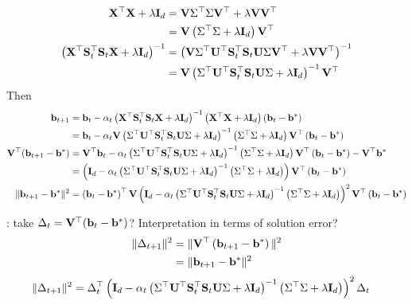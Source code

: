 \documentclass[10pt]{article}
\begin{document}
\begin{align*}
\mathbf{X}^\top\mathbf{X}+\lambda\mathbf{I}_d &= \mathbf{V}\Sigma^\top\Sigma\mathbf{V}^\top + \lambda \mathbf{V}\mathbf{V}^\top \\
&= \mathbf{V}\left(\Sigma^\top\Sigma + \lambda\mathbf{I}_d\right)\mathbf{V}^\top \\
\left(\mathbf{X}^\top\mathbf{S}_t^\top\mathbf{S}_t\mathbf{X} + \lambda\mathbf{I}_d\right)^{-1} &= \left(\mathbf{V}\Sigma^\top\mathbf{U}^\top\mathbf{S}_t^\top\mathbf{S}_t\mathbf{U}\Sigma\mathbf{V}^\top + \lambda\mathbf{V}\mathbf{V}^\top\right)^{-1} \\
&= \mathbf{V}\left(\Sigma^\top\mathbf{U}^\top\mathbf{S}_t^\top\mathbf{S}_t\mathbf{U}\Sigma + \lambda\mathbf{I}_d\right)^{-1}\mathbf{V}^\top
\end{align*}
Then
\begin{align*}
\mathbf{b}_{t+1} &= \mathbf{b}_t - \alpha_t\left(\mathbf{X}^\top\mathbf{S}_t^\top\mathbf{S}_t\mathbf{X} + \lambda\mathbf{I}_d\right)^{-1}\left(\mathbf{X}^\top\mathbf{X}+\lambda\mathbf{I}_d\right)\left(\mathbf{b}_t-\mathbf{b}^*\right) \\
&= \mathbf{b}_t - \alpha_t\mathbf{V}\left(\Sigma^\top\mathbf{U}^\top\mathbf{S}_t^\top\mathbf{S}_t\mathbf{U}\Sigma + \lambda\mathbf{I}_d\right)^{-1}\left(\Sigma^\top\Sigma + \lambda\mathbf{I}_d \right)\mathbf{V}^\top\left(\mathbf{b}_t-\mathbf{b}^*\right) \\
\mathbf{V}^\top(\mathbf{b}_{t+1}-\mathbf{b}^*) &= \mathbf{V}^\top\mathbf{b}_t - \alpha_t\left(\Sigma^\top\mathbf{U}^\top\mathbf{S}_t^\top\mathbf{S}_t\mathbf{U}\Sigma + \lambda\mathbf{I}_d\right)^{-1}\left(\Sigma^\top\Sigma + \lambda\mathbf{I}_d\right)\mathbf{V}^\top\left(\mathbf{b}_t-\mathbf{b}^*\right) - \mathbf{V}^\top\mathbf{b}^* \\
&= \left(\mathbf{I}_d - \alpha_t\left(\Sigma^\top\mathbf{U}^\top\mathbf{S}_t^\top\mathbf{S}_t\mathbf{U}\Sigma + \lambda\mathbf{I}_d\right)^{-1}\left(\Sigma^\top\Sigma + \lambda\mathbf{I}_d\right)\right)\mathbf{V}^\top\left(\mathbf{b}_t-\mathbf{b}^*\right) \\
\|\mathbf{b}_{t+1}-\mathbf{b}^*\|^2 &= \left(\mathbf{b}_t-\mathbf{b}^*\right)^\top\mathbf{V}\left(\mathbf{I}_d - \alpha_t\left(\Sigma^\top\mathbf{U}^\top\mathbf{S}_t^\top\mathbf{S}_t\mathbf{U}\Sigma + \lambda\mathbf{I}_d\right)^{-1}\left(\Sigma^\top\Sigma + \lambda\mathbf{I}_d\right)\right)^2\mathbf{V}^\top \left(\mathbf{b}_t-\mathbf{b}^*\right)
\end{align*}

\todo: take $\Delta_t=\mathbf{V}^\top(\mathbf{b}_t-\mathbf{b}^*)$? Interpretation in terms of solution error?
\begin{align*}
\|\Delta_{t+1}\|^2 &= \|\mathbf{V}^\top\left(\mathbf{b}_{t+1}-\mathbf{b}^*\right)\|^2 \\
&= \|\mathbf{b}_{t+1}-\mathbf{b}^*\|^2
\end{align*}
\begin{align*}
\|\Delta_{t+1}\|^2 &= \Delta_t^\top\left(\mathbf{I}_d - \alpha_t\left(\Sigma^\top\mathbf{U}^\top\mathbf{S}_t^\top\mathbf{S}_t\mathbf{U}\Sigma + \lambda\mathbf{I}_d\right)^{-1}\left(\Sigma^\top\Sigma + \lambda\mathbf{I}_d\right)\right)^2\Delta_t
\end{align*}
\end{document}

